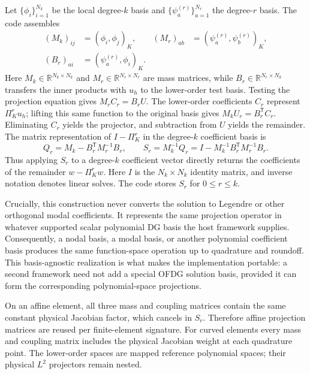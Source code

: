 Let $\{\phi_i\}_{i=1}^{N_k}$ be the local degree-$k$ basis and
$\{\psi_a^{(r)}\}_{a=1}^{N_r}$ the degree-$r$ basis.  The code assembles
\begin{align}
  (M_k)_{ij}&=(\phi_i,\phi_j)_K,
  & (M_r)_{ab}&=(\psi_a^{(r)},\psi_b^{(r)})_K,\\
  (B_r)_{ai}&=(\psi_a^{(r)},\phi_i)_K.
\end{align}
Here $M_k\in\mathbb R^{N_k\times N_k}$ and
$M_r\in\mathbb R^{N_r\times N_r}$ are mass matrices, while
$B_r\in\mathbb R^{N_r\times N_k}$ transfers the inner products with
$u_h$ to the lower-order test basis. Testing the projection equation gives
$M_r C_r=B_r U$. The lower-order coefficients $C_r$ represent
$\Pi_K^r u_h$; lifting this same function to the original basis gives
$M_k U_r=B_r^{\mathsf T}C_r$. Eliminating $C_r$ yields the projector,
and subtraction from $U$ yields the remainder.
The matrix representation of $I-\Pi_K^r$ in the degree-$k$ coefficient basis is
\begin{equation}
  Q_r=M_k-B_r^\mathsf{T}M_r^{-1}B_r,
  \qquad
  S_r=M_k^{-1}Q_r
     =I-M_k^{-1}B_r^\mathsf{T}M_r^{-1}B_r.
  \label{eq:ofdg-projection-matrices}
\end{equation}
Thus applying $S_r$ to a degree-$k$ coefficient vector directly returns the
coefficients of the remainder $w-\Pi_K^r w$.  Here $I$ is the $N_k\times N_k$ identity matrix, and inverse notation denotes linear solves.  The code stores $S_r$
for $0\leq r\leq k$.

Crucially, this construction never converts the solution to Legendre or other
orthogonal modal coefficients.  It represents the same projection operator in
whatever supported scalar polynomial DG basis the host framework supplies.
Consequently, a nodal basis, a modal basis, or another polynomial coefficient
basis produces the same function-space operation up to quadrature and roundoff.
This basis-agnostic realization is what makes the implementation portable: a
second framework need not add a special OFDG solution basis, provided it can
form the corresponding polynomial-space projections.

On an affine element, all three mass
and coupling matrices contain the same constant physical Jacobian factor, which
cancels in $S_r$.  Therefore affine projection matrices are reused per finite-element signature.
For curved elements every mass and coupling matrix includes the physical
Jacobian weight at each quadrature point.  The lower-order spaces are mapped
reference polynomial spaces; their physical $L^2$ projectors remain nested.

